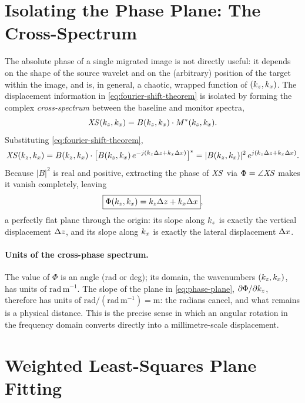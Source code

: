 \section{Isolating the Phase Plane: The Cross-Spectrum}
\label{sec:th-cross-spectrum}

The absolute phase of a single migrated image is not directly useful: it
depends on the shape of the source wavelet and on the (arbitrary) position of
the target within the image, and is, in general, a chaotic, wrapped function
of $(k_z,k_x)$. The displacement information in \cref{eq:fourier-shift-theorem}
is isolated by forming the complex \emph{cross-spectrum} between the baseline
and monitor spectra,
\begin{equation}
  \mathit{XS}(k_z,k_x) = B(k_z,k_x)\cdot M^{*}(k_z,k_x).
  \label{eq:cross-spectrum-def}
\end{equation}
Substituting \cref{eq:fourier-shift-theorem},
\begin{equation}
  \mathit{XS}(k_z,k_x) = B(k_z,k_x)\cdot\bigl[B(k_z,k_x)\, e^{-j(k_z \Delta z + k_x \Delta x)}\bigr]^{*}
  = |B(k_z,k_x)|^{2}\, e^{j(k_z \Delta z + k_x \Delta x)} .
  \label{eq:cross-spectrum-expand}
\end{equation}
Because $|B|^2$ is real and positive, extracting the phase of $\mathit{XS}$ via
$\Phi = \angle \mathit{XS}$ makes it vanish completely, leaving
\begin{equation}
  \boxed{\Phi(k_z,k_x) = k_z \Delta z + k_x \Delta x} ,
  \label{eq:phase-plane}
\end{equation}
a perfectly flat plane through the origin: its slope along $k_z$ is exactly
the vertical displacement $\Delta z$, and its slope along $k_x$ is exactly the
lateral displacement $\Delta x$.

\paragraph{Units of the cross-phase spectrum.} The value of $\Phi$ is an
angle (rad or deg); its domain, the wavenumbers $(k_z,k_x)$, has units of
$\mathrm{rad\,m^{-1}}$. The slope of the plane in \cref{eq:phase-plane},
$\partial\Phi/\partial k_z$, therefore has units of
$\mathrm{rad} / (\mathrm{rad\,m^{-1}}) = \mathrm{m}$: the radians cancel, and
what remains is a physical distance. This is the precise sense in which an
angular rotation in the frequency domain converts directly into a
millimetre-scale displacement.

\section{Weighted Least-Squares Plane Fitting}
\label{sec:th-wls}

